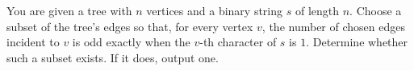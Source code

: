 You are given a tree with $n$ vertices and a binary string $s$ of length $n$.
Choose a subset of the tree's edges so that, for every vertex $v$, the number
of chosen edges incident to $v$ is odd exactly when the $v$-th character of
$s$ is $1$. Determine whether such a subset exists. If it does, output one.
